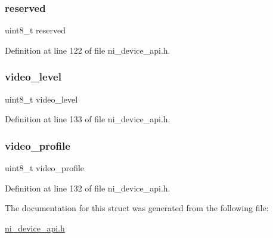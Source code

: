 \subsubsection{\texorpdfstring{reserved}{reserved}}
{\footnotesize\ttfamily uint8\+\_\+t reserved}



Definition at line 122 of file ni\+\_\+device\+\_\+api.\+h.

\mbox{\label{struct__ni__hw__capability_a4b623f3cc710f9e3edb7da7aee734242}} 
\subsubsection{\texorpdfstring{video\_level}{video\_level}}
{\footnotesize\ttfamily uint8\+\_\+t video\+\_\+level}



Definition at line 133 of file ni\+\_\+device\+\_\+api.\+h.

\mbox{\label{struct__ni__hw__capability_a6ac0df93e34a92f42f95c483556d0822}} 
\subsubsection{\texorpdfstring{video\_profile}{video\_profile}}
{\footnotesize\ttfamily uint8\+\_\+t video\+\_\+profile}



Definition at line 132 of file ni\+\_\+device\+\_\+api.\+h.



The documentation for this struct was generated from the following file\+:\begin{DoxyCompactItemize}
\item 
\mbox{\hyperlink{ni__device__api_8h}{ni\+\_\+device\+\_\+api.\+h}}\end{DoxyCompactItemize}
